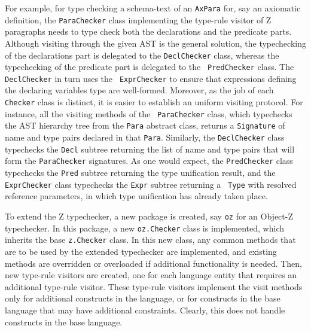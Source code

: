 \documentclass{llncs}
\begin{document}
For example, for type checking a schema-text of an {\tt AxPara} for,
say an axiomatic definition, the {\tt ParaChecker} class implementing
the type-rule visitor of Z paragraphs needs to type check both the
declarations and the predicate parts.  Although visiting through the
given AST is the general solution, the typechecking of the
declarations part is delegated to the {\tt DeclChecker} class, whereas
the typechecking of the predicate part is delegated to the {\tt
PredChecker} class.  The {\tt DeclChecker} in turn uses the {\tt
ExprChecker} to ensure that expressions defining the declaring
variables type are well-formed.  Moreover, as the job of each {\tt
Checker} class is distinct, it is easier to establish an uniform
visiting protocol. For instance, all the visiting methods of the {\tt
ParaChecker} class, which typechecks the AST hierarchy tree from the
{\tt Para} abstract class, returns a {\tt Signature} of name and type
pairs declared in that {\tt Para}. Similarly, the {\tt DeclChecker}
class typechecks the {\tt Decl} subtree returning the list of name and
type pairs that will form the {\tt ParaChecker} signatures.  As one
would expect, the {\tt PredChecker} class typechecks the {\tt Pred}
subtree returning the type unification result, and the {\tt
ExprChecker} class typechecks the {\tt Expr} subtree returning a {\tt
Type} with resolved reference parameters, in which type unification
has already taken place.

To extend the Z typechecker, a new package is created, say {\tt oz}
for an Object-Z typechecker.  In this package, a new {\tt oz.Checker}
class is implemented, which inherits the base {\tt z.Checker}
class. In this new class, any common methods that are to be used by
the extended typechecker are implemented, and existing methods are
overridden or overloaded if additional functionality is needed.  Then,
new type-rule visitors are created, one for each language entity that
requires an additional type-rule visitor.  These type-rule visitors
implement the visit methods only for additional constructs in the
language, or for constructs in the base language that may have
additional constraints. Clearly, this does not handle constructs in
the base language.
\end{document}
